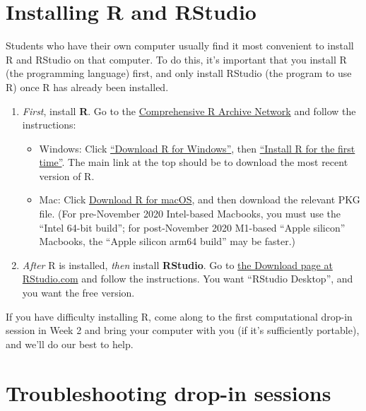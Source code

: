 \documentclass[
  a4paper,
]{book}
\providecommand{\tightlist}{%
  \setlength{\itemsep}{0pt}\setlength{\parskip}{0pt}}
\theoremstyle{definition}
\theoremstyle{definition}
\theoremstyle{definition}
\theoremstyle{definition}
\theoremstyle{remark}
\begin{document}
\hypertarget{r-install}{%
\section*{Installing R and RStudio}\label{r-install}}

Students who have their own computer usually find it most convenient to install R and RStudio on that computer. To do this, it's important that you install R (the programming language) first, and only install RStudio (the program to use R) once R has already been installed.

\begin{enumerate}
\def\labelenumi{\arabic{enumi}.}
\item
  \emph{First}, install \textbf{R}. Go to the \href{https://cran.r-project.org/}{Comprehensive R Archive Network} and follow the instructions:

  \begin{itemize}
  \tightlist
  \item
    Windows: Click \href{https://cran.r-project.org/bin/windows/}{``Download R for Windows''}, then \href{https://cran.r-project.org/bin/windows/base/}{``Install R for the first time''}. The main link at the top should be to download the most recent version of R.
  \item
    Mac: Click \href{https://cran.r-project.org/bin/macosx/}{Download R for macOS}, and then download the relevant PKG file. (For pre-November 2020 Intel-based Macbooks, you must use the ``Intel 64-bit build''; for post-November 2020 M1-based ``Apple silicon'' Macbooks, the ``Apple silicon arm64 build'' may be faster.)
  \end{itemize}
\item
  \emph{After} R is installed, \emph{then} install \textbf{RStudio}. Go to \href{https://www.rstudio.com/products/rstudio/download/\#download}{the Download page at RStudio.com} and follow the instructions. You want ``RStudio Desktop'', and you want the free version.
\end{enumerate}

If you have difficulty installing R, come along to the first computational drop-in session in Week 2 and bring your computer with you (if it's sufficiently portable), and we'll do our best to help.

\hypertarget{troubleshooting}{%
\section*{Troubleshooting drop-in sessions}\label{troubleshooting}}
\end{document}
